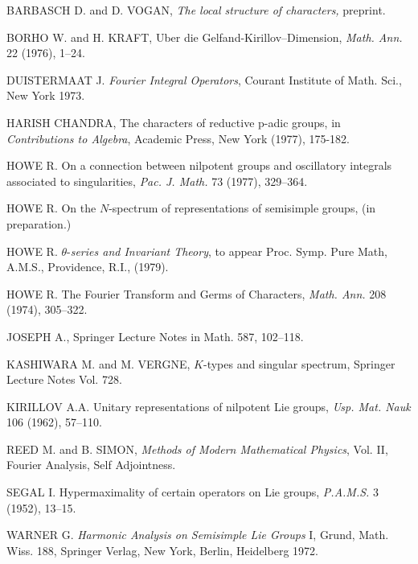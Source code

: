 \begin{thebibliography}{99}
 BARBASCH D. and D. VOGAN, {\em The local structure of characters,} preprint.

 BORHO W. and H. KRAFT, Uber die Gelfand-Kirillov--Dimension, {\em Math. Ann.} 22 (1976), 1--24.

 DUISTERMAAT J. {\em Fourier Integral Operators}, Courant Institute of Math. Sci., New York 1973.

 HARISH CHANDRA, The characters of reductive p-adic groups, in {\em Contributions to Algebra}, Academic Press, New York (1977), 175-182.

 HOWE R. On a connection between nilpotent groups and oscillatory integrals associated to singularities, {\em Pac. J. Math.} 73 (1977), 329--364. 

 HOWE R. On the $N$-spectrum of representations of semisimple groups, (in preparation.)

 HOWE R. $\theta$-{\em series and Invariant Theory}, to appear Proc. Symp. Pure Math, A.M.S., Providence, R.I., (1979).

 HOWE R. The Fourier Transform and Germs of Characters, {\em Math. Ann.} 208 (1974), 305--322.

 JOSEPH A., Springer Lecture Notes in Math. 587, 102--118.

 KASHIWARA M. and M. VERGNE, $K$-types and singular spectrum, Springer Lecture Notes Vol. 728.

 KIRILLOV A.A. Unitary representations of nilpotent Lie groups, {\em Usp. Mat. Nauk} 106 (1962), 57--110.

 REED M. and B. SIMON, {\em Methods of Modern Mathematical Physics}, Vol. II, Fourier Analysis, Self Adjointness.

 SEGAL I. Hypermaximality of certain operators on Lie groups, {\em P.A.M.S.} 3 (1952), 13--15.

 WARNER G. {\em Harmonic Analysis on Semisimple Lie Groups} I, Grund, Math. Wiss. 188, Springer Verlag, New York, Berlin, Heidelberg 1972.


\end{thebibliography}

